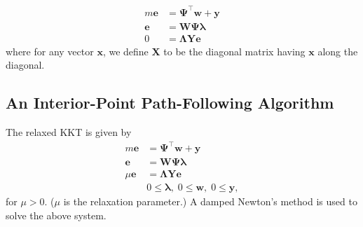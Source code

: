 \begin{align}
	m\bm{e} &= \bm{\Psi}^\intercal \bm{w} + \bm{y} \\
	\bm{e} &= \bm{W}\bm{\Psi} \bm{\lambda} \\
	0 &= \bm{\Lambda} \bm{Y} \bm{e}
\end{align}
where for any vector $\bm{x}$, we define $\bm{X}$ to be the diagonal matrix having $\bm{x}$ along the diagonal.

\subsection{An Interior-Point Path-Following Algorithm}

The relaxed KKT is given by
\begin{align}
	m\bm{e} &=\bm{\Psi}^\intercal \bm{w} + \bm{y} \label{Eqn:StartRelKKT}\\
	\bm{e} &= \bm{W} \bm{\Psi} \bm{\lambda} \\
	\mu \bm{e} &= \bm{\Lambda} \bm{Y} \bm{e} \\
	& 0 \le \bm{\lambda}, \; 0 \le \bm{w}, \; 0 \le \bm{y}, \label{Eqn:EndRelKKT}
\end{align}
for $\mu > 0$. ($\mu$ is the relaxation parameter.)
A damped Newton's method is used to solve the above system.   

